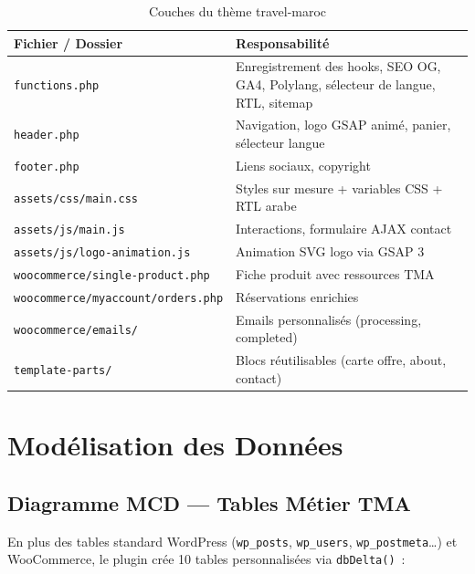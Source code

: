 \documentclass[12pt,a4paper]{report}
\begin{document}
\begin{table}[H]
\centering
\caption{Couches du th\`eme travel-maroc}
\begin{tabularx}{\textwidth}{lX}
  \toprule
  \textbf{Fichier / Dossier} & \textbf{Responsabilit\'e} \\
  \midrule
  \texttt{functions.php}   & Enregistrement des hooks, SEO OG, GA4, Polylang,
                             sélecteur de langue, RTL, sitemap \\
  \texttt{header.php}      & Navigation, logo GSAP animé, panier, sélecteur langue \\
  \texttt{footer.php}      & Liens sociaux, copyright \\
  \texttt{assets/css/main.css} & Styles sur mesure + variables CSS + RTL arabe \\
  \texttt{assets/js/main.js}   & Interactions, formulaire AJAX contact \\
  \texttt{assets/js/logo-animation.js} & Animation SVG logo via GSAP 3 \\
  \texttt{woocommerce/single-product.php} & Fiche produit avec ressources TMA \\
  \texttt{woocommerce/myaccount/orders.php} & Réservations enrichies \\
  \texttt{woocommerce/emails/}  & Emails personnalis\'es (processing, completed) \\
  \texttt{template-parts/}      & Blocs r\'eutilisables (carte offre, about, contact) \\
  \bottomrule
\end{tabularx}
\end{table}

\chapter{Mod\'elisation des Donn\'ees}

\section{Diagramme MCD --- Tables M\'etier TMA}

En plus des tables standard WordPress (\texttt{wp\_posts}, \texttt{wp\_users},
\texttt{wp\_postmeta}\ldots) et WooCommerce, le plugin cr\'ee 10 tables
personnalis\'ees via \texttt{dbDelta()}~:
\end{document}
